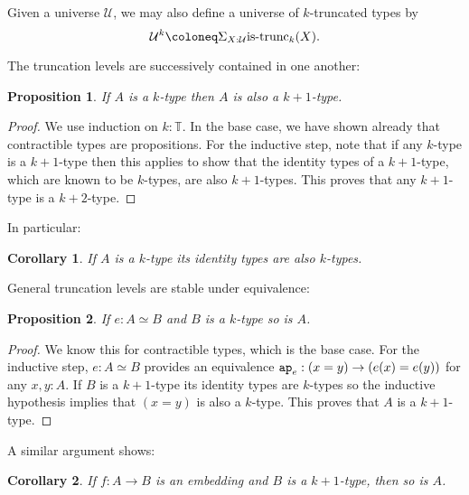 \documentclass{amsart}
\theoremstyle{theorem}
\newtheorem*{cor}{Corollary}
\newtheorem*{prop}{Proposition}
\theoremstyle{definition}
\theoremstyle{remark}
\newcommand{\0}{\mathbbe{0}}
\newcommand{\1}{\mathbbe{1}}
\newcommand{\2}{\mathbbe{2}}
\newcommand{\3}{\mathbbe{3}}
\newcommand{\4}{\mathbbe{4}}
\newcommand{\term}[1]{{\textup{\texttt{#1}}}}
\newcommand{\type}[1]{{\textup{#1}}}
\newcommand{\bT}{{\mathbb{T}}}
\newcommand{\ap}{\term{ap}}
\newcommand{\UU}{{\mathcal{U}}}
\newcommand{\is}[1]{\type{is-{#1}}}
\begin{document}
Given a universe $\UU$, we may also define a universe of $k$-truncated types by
\[ \UU^k \coloneq \Sigma_{X:\UU} \is{trunc}_k(X).\]


The truncation levels are successively contained in one another:

\begin{prop} If $A$ is a $k$-type then $A$ is also a $k+1$-type.
\end{prop}
\begin{proof}
We use induction on $k : \bT$. In the base case, we have shown already that contractible types are propositions. For the inductive step, note that if any $k$-type is a $k+1$-type then this applies to show that the identity types of a $k+1$-type, which are known to be $k$-types, are also $k+1$-types. This proves that any $k+1$-type is a $k+2$-type.
\end{proof}

In particular:

\begin{cor} If $A$ is a $k$-type its identity types are also $k$-types.
\end{cor}

General truncation levels are stable under equivalence:

\begin{prop} If $e : A \simeq B$ and $B$ is a $k$-type so is $A$.
\end{prop}
\begin{proof}
We know this for contractible types, which is the base case. For the inductive step, $e: A \simeq B$ provides an equivalence $\ap_e :(x=y) \to (e(x)=e(y))$ for any $x,y:A$. If $B$ is a $k+1$-type its identity types are $k$-types so the inductive hypothesis implies that $(x=y)$ is also a $k$-type. This proves that $A$ is a $k+1$-type.
\end{proof}

A similar argument shows:

\begin{cor} If $f \colon A \to B$ is an embedding and $B$ is a $k+1$-type, then so is $A$.
\end{cor}
\end{document}
